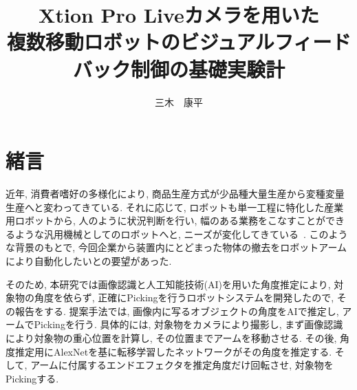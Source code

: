 \documentclass{suribt}
\title{\huge Xtion Pro Liveカメラを用いた\\複数移動ロボットのビジュアルフィードバック制御の基礎実験計}
\author{三木　康平}
\begin{document}
\maketitle %
\frontmatter %
\begin{abstract}%




\end{abstract}
\tableofcontents%
\mainmatter%
\chapter{緒言}
近年, 消費者嗜好の多様化により, 商品生産方式が少品種大量生産から変種変量生産へと変わってきている. それに応じて, ロボットも単一工程に特化した産業用ロボットから, 人のように状況判断を行い, 幅のある業務をこなすことができるような汎用機械としてのロボットへと, ニーズが変化してきている~\cite{Iziri-2019}. このような背景のもとで, 今回企業から装置内にとどまった物体の撤去をロボットアームにより自動化したいとの要望があった. 

そのため, 本研究では画像認識と人工知能技術(AI)を用いた角度推定により, 対象物の角度を依らず, 正確にPickingを行うロボットシステムを開発したので, その報告をする. 提案手法では, 画像内に写るオブジェクトの角度をAIで推定し, アームでPickingを行う. 具体的には, 対象物をカメラにより撮影し, まず画像認識により対象物の重心位置を計算し, その位置までアームを移動させる. その後, 角度推定用にAlexNetを基に転移学習したネットワークがその角度を推定する. そして, アームに付属するエンドエフェクタを推定角度だけ回転させ, 対象物をPickingする. 

\end{document}
